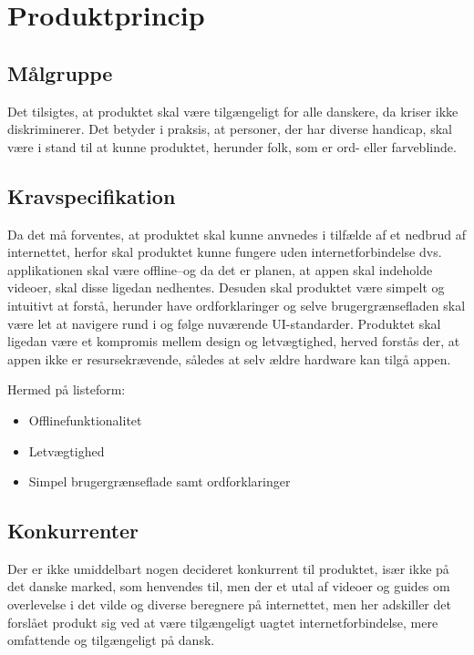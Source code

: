 \section{Produktprincip \label{sec:produktprincip}}
\subsection{Målgruppe}
Det tilsigtes, at produktet skal være tilgængeligt for alle danskere, da kriser ikke diskriminerer. Det betyder i praksis, at personer, der har diverse handicap, skal være i stand til at kunne produktet, herunder folk, som er ord- eller farveblinde.
\subsection{Kravspecifikation}
Da det må forventes, at produktet skal kunne anvnedes i tilfælde af et nedbrud af internettet, herfor skal produktet kunne fungere uden internetforbindelse dvs. applikationen skal være offline--og da det er planen, at appen skal indeholde videoer, skal disse ligedan nedhentes.
Desuden skal produktet være simpelt og intuitivt at forstå, herunder have ordforklaringer og selve brugergrænsefladen skal være let at navigere rund i og følge nuværende UI-standarder.
Produktet skal ligedan være et kompromis mellem design og letvægtighed, herved forstås der, at appen ikke er resursekrævende, således at selv ældre hardware kan tilgå appen.

Hermed på listeform:
\begin{itemize}
    \item Offlinefunktionalitet
    \item Letvægtighed
    \item Simpel brugergrænseflade samt ordforklaringer
\end{itemize}

\subsection{Konkurrenter}
Der er ikke umiddelbart nogen decideret konkurrent til produktet, især ikke på det danske marked, som henvendes til, men der et utal af videoer og guides om overlevelse i det vilde og diverse beregnere på internettet, men her adskiller det forslået produkt sig ved at være tilgængeligt uagtet internetforbindelse, mere omfattende og tilgængeligt på dansk.